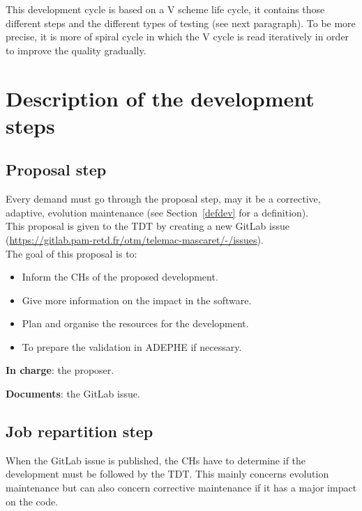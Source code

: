 This development cycle is based on a V scheme life cycle, it contains those
different steps and the different types of testing (see next paragraph). To be
more precise, it is more of spiral cycle in which the V cycle is read
iteratively in order to improve the quality gradually.

\section{Description of the development steps}
\label{dev}

\subsection{Proposal step}

Every demand must go through the proposal step, may it be a corrective,
adaptive, evolution maintenance (see Section~\ref{defdev} for a definition).\\

This proposal is given to the TDT by creating a new GitLab issue
(\url{https://gitlab.pam-retd.fr/otm/telemac-mascaret/-/issues}).\\

The goal of this proposal is to:
\begin{itemize}
\item Inform the CHs of the proposed development.
\item Give more information on the impact in the software.
\item Plan and organise the resources for the development.
\item To prepare the validation in ADEPHE if necessary.
\end{itemize}

\textbf{In charge}: the proposer.

\textbf{Documents}: the GitLab issue.

\subsection{Job repartition step}

When the GitLab issue is published, the CHs have to determine if the
development must be followed by the TDT\@. This mainly concerns evolution
maintenance but can also concern corrective maintenance if it has a major
impact on the code.\\

